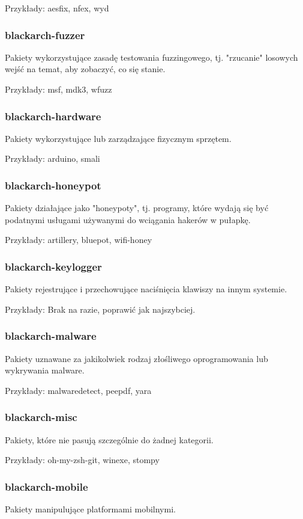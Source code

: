 \documentclass[a4paper, oneside, 11pt]{book}
\begin{document}
Przykłady: aesfix, nfex, wyd

\subsubsection{blackarch-fuzzer}
Pakiety wykorzystujące zasadę testowania fuzzingowego, tj. "rzucanie" losowych wejść na temat, aby zobaczyć, co się stanie.

Przykłady: msf, mdk3, wfuzz

\subsubsection{blackarch-hardware}
Pakiety wykorzystujące lub zarządzające fizycznym sprzętem.

Przykłady: arduino, smali

\subsubsection{blackarch-honeypot}
Pakiety działające jako "honeypoty", tj. programy, które wydają się być podatnymi usługami używanymi do wciągania hakerów w pułapkę.

Przykłady: artillery, bluepot, wifi-honey

\subsubsection{blackarch-keylogger}
Pakiety rejestrujące i przechowujące naciśnięcia klawiszy na innym systemie.

Przykłady: Brak na razie, poprawić jak najszybciej.

\subsubsection{blackarch-malware}
Pakiety uznawane za jakikolwiek rodzaj złośliwego oprogramowania lub wykrywania malware.

Przykłady: malwaredetect, peepdf, yara

\subsubsection{blackarch-misc}
Pakiety, które nie pasują szczególnie do żadnej kategorii.

Przykłady: oh-my-zsh-git, winexe, stompy

\subsubsection{blackarch-mobile}
Pakiety manipulujące platformami mobilnymi.
\end{document}
